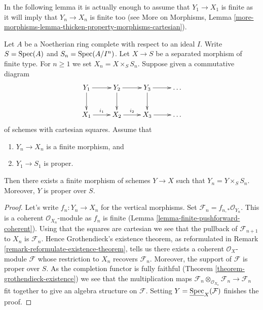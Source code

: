 \noindent
In the following lemma it is actually enough to assume that $Y_1 \to X_1$
is finite as it will imply that $Y_n \to X_n$ is finite too
(see More on Morphisms, Lemma
\ref{more-morphisms-lemma-thicken-property-morphisms-cartesian}).

\begin{lemma}
\label{lemma-algebraize-formal-scheme-finite-over-proper}
Let $A$ be a Noetherian ring complete with respect to an ideal $I$.
Write $S = \mathop{\mathrm{Spec}}(A)$ and $S_n = \mathop{\mathrm{Spec}}(A/I^n)$.
Let $X \to S$ be a separated morphism of finite type.
For $n \geq 1$ we set $X_n = X \times_S S_n$.
Suppose given a commutative diagram
$$
\xymatrix{
Y_1 \ar[r] \ar[d] & Y_2 \ar[r] \ar[d] & Y_3 \ar[r] \ar[d] & \ldots \\
X_1 \ar[r]^{i_1} & X_2 \ar[r]^{i_2} & X_3 \ar[r] & \ldots
}
$$
of schemes with cartesian squares. Assume that
\begin{enumerate}
\item $Y_n \to X_n$ is a finite morphism, and
\item $Y_1 \to S_1$ is proper.
\end{enumerate}
Then there exists a finite morphism of schemes $Y \to X$ such that
$Y_n = Y \times_S S_n$. Moreover, $Y$ is proper over $S$.
\end{lemma}

\begin{proof}
Let's write $f_n : Y_n \to X_n$ for the vertical morphisms.
Set $\mathcal{F}_n = f_{n, *}\mathcal{O}_{Y_n}$. This is
a coherent $\mathcal{O}_{X_n}$-module as $f_n$ is finite
(Lemma \ref{lemma-finite-pushforward-coherent}).
Using that the squares are cartesian we see that
the pullback of $\mathcal{F}_{n + 1}$ to $X_n$ is $\mathcal{F}_n$.
Hence Grothendieck's existence theorem, as reformulated in
Remark \ref{remark-reformulate-existence-theorem},
tells us there exists a coherent $\mathcal{O}_X$-module
$\mathcal{F}$ whose restriction to $X_n$ recovers $\mathcal{F}_n$.
Moreover, the support of $\mathcal{F}$ is proper over $S$.
As the completion functor is fully faithful
(Theorem \ref{theorem-grothendieck-existence})
we see that the multiplication maps
$\mathcal{F}_n \otimes_{\mathcal{O}_{X_n}} \mathcal{F}_n \to
\mathcal{F}_n$ fit together to give an algebra structure on $\mathcal{F}$.
Setting $Y = \underline{\mathop{\mathrm{Spec}}}_X(\mathcal{F})$ finishes the proof.
\end{proof}

